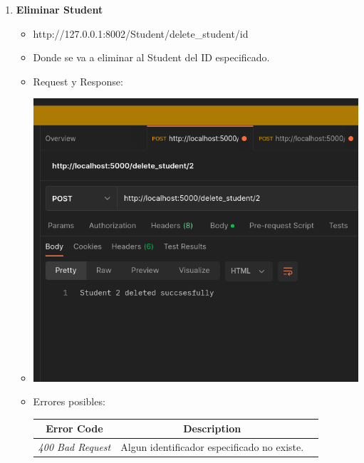 \documentclass{article}
\begin{document}
\begin{enumerate}
    \item \textbf{Eliminar Student}
    \begin{itemize}
        \item http://127.0.0.1:8002/Student/delete\_student/id
        \item Donde se va a eliminar al Student del ID especificado.
        \item Request y Response:
        \item \includegraphics[scale=.5]{assets/student/delete.png}
        \item Errores posibles: \begin{table}[H] \centering
        \begin{tabular}{|c|c|l|} \hline \textbf{Error Code} &
        \textbf{Description} \\ \hline \textit{400 Bad Request} & Algun
        identificador especificado no existe. \\ \hline \end{tabular}
        \end{table}
    \end{itemize}
\end{enumerate}


\end{document}
